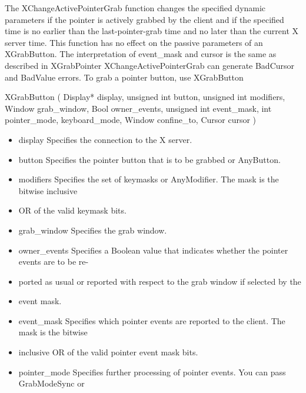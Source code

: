\documentclass{report}
\begin{document}
\begin{itemize}
\begin{itemize}
            \end{itemize}
            The XChangeActivePointerGrab function changes the specified dynamic parameters if the pointer is actively grabbed by the client and if the specified time is no earlier than the last-pointer-grab time and no later than the current X server time. This function has no effect on the passive parameters of an XGrabButton. The interpretation of event\_mask and cursor is the same as described in XGrabPointer
            \bigbreak \noindent 
            XChangeActivePointerGrab can generate BadCursor and BadValue errors. To grab a pointer button, use XGrabButton
            \bigbreak \noindent 
            \begin{cppcode}
            XGrabButton (
                Display* display,
                unsigned int button,
                unsigned int modifiers,
                Window grab_window,
                Bool owner_events,
                unsigned int event_mask,
                int pointer_mode, keyboard_mode,
                Window confine_to,
                Cursor cursor
            )
            \end{cppcode}
            \bigbreak \noindent
            \begin{itemize}
                \item display Specifies the connection to the X server.
                \item button Specifies the pointer button that is to be grabbed or AnyButton.
                \item modifiers Specifies the set of keymasks or AnyModifier. The mask is the bitwise inclusive
                \item OR of the valid keymask bits.
                \item grab\_window Specifies the grab window.
                \item owner\_events Specifies a Boolean value that indicates whether the pointer events are to be re-
                \item ported as usual or reported with respect to the grab window if selected by the
                \item event mask.
                \item event\_mask Specifies which pointer events are reported to the client. The mask is the bitwise
                \item inclusive OR of the valid pointer event mask bits.
                \item pointer\_mode Specifies further processing of pointer events. You can pass GrabModeSync or

\end{itemize}
\end{itemize}
\end{document}
